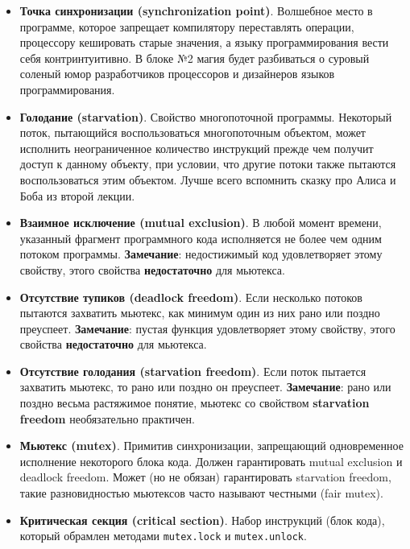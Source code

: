 \documentclass[a4paper, 12pt]{extarticle}
\begin{document}
\begin{itemize}

	\item \textbf{Точка синхронизации (synchronization point)}. Волшебное место в программе, которое запрещает компилятору переставлять операции, процессору кешировать старые значения, а языку программирования вести себя контринтуитивно. В блоке №2 магия будет разбиваться о суровый соленый юмор разработчиков процессоров и дизайнеров языков программирования.

	\item \textbf{Голодание (starvation)}. Свойство многопоточной программы. Некоторый поток, пытающийся воспользоваться многопоточным объектом, может исполнить неограниченное количество инструкций прежде чем получит доступ к данному объекту, при условии, что другие потоки также пытаются воспользоваться этим объектом. Лучше всего вспомнить сказку про Алиса и Боба из второй лекции. 

	\item \textbf{Взаимное исключение (mutual exclusion)}. В любой момент времени, указанный фрагмент программного кода исполняется не более чем одним потоком программы. \textbf{Замечание}: недостижимый код удовлетворяет этому свойству, этого свойства \textbf{недостаточно} для мьютекса.

	\item \textbf{Отсутствие тупиков (deadlock freedom)}. Если несколько потоков пытаются захватить мьютекс, как минимум один из них рано или поздно преуспеет. \textbf{Замечание}: пустая функция удовлетворяет этому свойству, этого свойства \textbf{недостаточно} для мьютекса.

	\item \textbf{Отсутствие голодания (starvation freedom)}. Если поток пытается захватить мьютекс, то рано или поздно он преуспеет.
	\textbf{Замечание}: рано или поздно весьма растяжимое понятие, мьютекс со свойством \textbf{starvation freedom} необязательно практичен.

	\item \textbf{Мьютекс (mutex)}. Примитив синхронизации, запрещающий одновременное исполнение некоторого блока кода. Должен гарантировать mutual exclusion и deadlock freedom. Может (но не обязан) гарантировать starvation freedom, такие разновидностью мьютексов часто называют честными (fair mutex).

	\item \textbf{Критическая секция (critical section)}. Набор инструкций (блок кода), который обрамлен методами \texttt{mutex.lock} и \texttt{mutex.unlock}.


\end{itemize}
\end{document}
